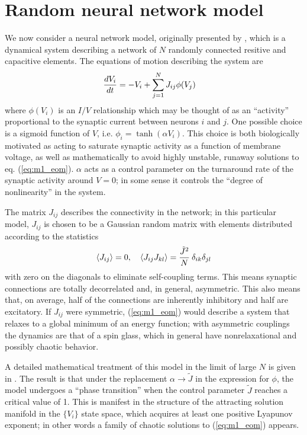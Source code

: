\documentclass{article} %
\begin{document}
\section{Random neural network model}
We now consider a neural network model, originally presented by \cite{Sompolinsky1988}, which is a dynamical system describing a network of $N$ randomly connected resitive and capacitive elements.  The equations of motion describing the system are
\begin{align}
	\frac{d V_i}{d t} &= -V_i + \sum_{j=1}^{N} J_{ij} \phi(V_j) \label{eq:m1_eom}
\end{align}
where $\phi(V_i)$ is an $I/V$ relationship which may be thought of as an ``activity'' proportional to the synaptic current between neurons $i$ and $j$.  One possible choice is a sigmoid function of $V$, i.e. $\phi_i = \tanh\left(\alpha V_i\right)$.  This choice is both biologically motivated as acting to saturate synaptic activity as a function of membrane voltage, as well as mathematically to avoid highly unstable, runaway solutions to eq. (\ref{eq:m1_eom}).  $\alpha$ acts as a control parameter on the turnaround rate of the synaptic activity around $V = 0$; in some sense it controls the ``degree of nonlinearity'' in the system.

The matrix $J_{ij}$ describes the connectivity in the network; in this particular model, $J_{ij}$ is chosen to be a Gaussian random matrix with elements distributed according to the statistics
\begin{align}
	\left\langle J_{ij} \right\rangle = 0, \quad \left\langle J_{ij}J_{kl} \right\rangle = \frac{\tilde{J}^2}{N} \: \delta_{ik}\delta_{jl} \label{eq:m1_stats}
\end{align}
with zero on the diagonals to eliminate self-coupling terms.  This means synaptic connections are totally decorrelated and, in general, asymmetric.  This also means that, on average, half of the connections are inherently inhibitory and half are excitatory.  If $J_{ij}$ were symmetric, (\ref{eq:m1_eom}) would describe a system that relaxes to a global minimum of an energy function; with asymmetric couplings the dynamics are that of a spin glass, which in general have nonrelaxational and possibly chaotic behavior.

A detailed mathematical treatment of this model in the limit of large $N$ is given in \cite{Sompolinsky1988}.  The result is that under the replacement $\alpha \rightarrow \tilde{J}$ in the expression for $\phi$, the model undergoes a ``phase transition'' when the control parameter $\tilde{J}$ reaches a critical value of 1.  This is manifest in the structure of the attracting solution manifold in the $\{V_i\}$ state space, which acquires at least one positive Lyapunov exponent; in other words a family of chaotic solutions to (\ref{eq:m1_eom}) appears.
\end{document}
